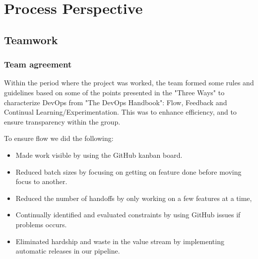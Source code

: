 \newpage
\section{Process Perspective}






\subsection{Teamwork}
\subsubsection{Team agreement}
Within the period where the project was worked, the team formed some rules and guidelines based on some of the points presented in the "Three Ways" to characterize DevOps from "The DevOps Handbook": Flow, Feedback and Continual Learning/Experimentation. This was to enhance efficiency, and to ensure transparency within the group.

\noindent To ensure flow we did the following:
\begin{itemize}
    \item Made work visible by using the GitHub kanban board.
    \item Reduced batch sizes by focusing on getting on feature done before moving focus to another.
    \item Reduced the number of handoffs by only working on a few features at a time,
    \item Continually identified and evaluated constraints by using GitHub issues if problems occurs.
    \item Eliminated hardship and waste in the value stream by implementing automatic releases in our pipeline.
\end{itemize}

